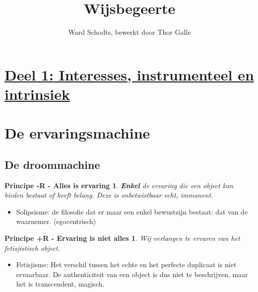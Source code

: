 \documentclass[11pt,a4paper]{article}
\begin{document}
\title{\huge Wijsbegeerte}
\author{Ward Schodts, bewerkt door Thor Galle}
\date{}
\maketitle


\section*{\centering \underline{Deel 1: Interesses, instrumenteel en intrinsiek}}

\section{De ervaringsmachine}
\subsection{De droommachine}
\newtheorem*{-R}{Principe -R - Alles is ervaring}
	\begin{-R}
	\textbf{Enkel} de ervaring die een object kan bieden bestaat of heeft belang.
	\newline Deze is onbetwistbaar echt, immanent.
	\end{-R}
	\begin{itemize}
	\item Solipsisme: de filosofie dat er maar een enkel bewustzijn bestaat: dat van de waarnemer. (egocentrisch)
	\end{itemize}
\newtheorem*{+R}{Principe +R - Ervaring is niet alles}
	\begin{+R}
	Wij verlangen te ervaren van het fetisjistisch object.
	\end{+R}
	\begin{itemize}
	\item Fetisjisme: Het verschil tussen het echte en het perfecte duplicaat is niet ervaarbaar. De authenticiteit van een object is dus niet te beschrijven, maar het is transcendent, magisch.
	\end{itemize}
\end{document}
